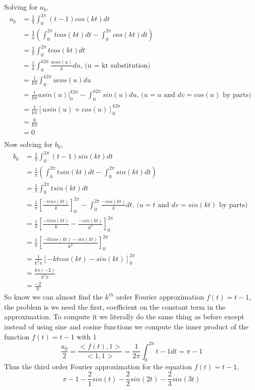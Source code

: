 \documentclass{amsart}
\begin{document}
Solving for $a_k$,
\begin{align*}
a_k &= \frac{1}{\pi} \int_{0}^{2\pi}(t - 1)cos(kt)dt\\
& = \frac{1}{\pi} (\int_{0}^{2\pi}tcos(kt)dt - \int_{0}^{2\pi}cos(kt) dt)\\
& =  \frac{1}{\pi} \int_{0}^{2\pi}tcos(kt)dt\\
&=  \frac{1}{\pi} \int_{0}^{k2\pi}\frac{ucos(u)}{k}du \text{,      (u = kt substitution)}\\
&=  \frac{1}{k\pi} \int_{0}^{k2\pi}ucos(u)du\\
& = \frac{1}{k\pi} usin(u) |_{0}^{k2\pi} - \int_{0}^{k2\pi}sin(u)du   \text{,    ($u = u$ and $dv = cos(u)$ by parts) }\\
&= \frac{1}{k\pi} [usin(u) + cos(u)]_{0}^{k2\pi}\\
&= \frac{0}{k\pi}\\
&= 0\\
\end{align*}
Now solving for $b_k$,
\begin{align*}
b_k &= \frac{1}{\pi} \int_{0}^{2\pi}(t - 1)sin(kt)dt\\
& = \frac{1}{\pi} (\int_{0}^{2\pi}tsin(kt)dt - \int_{0}^{2\pi}sin(kt) dt)\\
& =  \frac{1}{\pi} \int_{0}^{2\pi}tsin(kt)dt\\
& = \frac{1}{\pi} [\frac{-tcos(kt)}{k}]_{0}^{2\pi} - \int_{0}^{2\pi} \frac{-cos(kt)}{k}dt  \text{,    ($u = t$ and $dv = sin(kt)$ by parts) }\\
& = \frac{1}{\pi} [\frac{-tcos(kt)}{k} - \frac{-sin(kt)}{k^2}]_{0}^{2\pi}\\
 & = \frac{1}{\pi} [\frac{-ktcos(kt)-sin(kt)}{k^2}]_{0}^{2\pi}\\
   & = \frac{1}{k^2 \pi} [{-ktcos(kt)-sin(kt)}]_{0}^{2\pi}\\
  & = \frac{k\pi (-2)}{k^2\pi}\\
  & = \frac{-2}{k}
\end{align*}
So know we can almost find the $k^{th}$ order Fourier approximation $f(t) = t - 1$, the problem is we need the first, coefficient on the constant term in the approximation. To compute it we literally do the same thing as before except instead of using sine and cosine functions we compute the inner product of the function $f(t) = t - 1$ with $1$ 
\begin{equation*}
\frac{a_0}{2} = \frac{<f(t),1>}{<1,1>} = \frac{1}{2\pi} \int_{0}^{2\pi}t - 1dt = \pi - 1
\end{equation*}
Thus the third order Fourier approximation for the equation $f(t) = t - 1$,
\begin{equation*}
\pi - 1- \frac{2}{1}sin(t) - \frac{2}{2}sin(2t) - \frac{2}{3} sin(3t)
\end{equation*}
\end{document}
